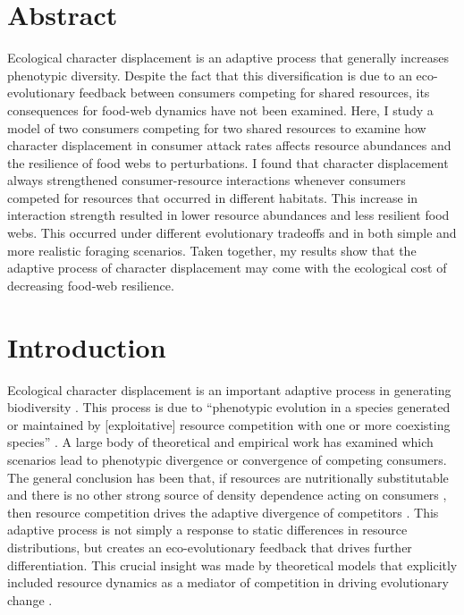 \documentclass[11pt,]{article}
\begin{document}
\newpage

\section{Abstract}\label{abstract}

Ecological character displacement is an adaptive process that generally
increases phenotypic diversity. Despite the fact that this
diversification is due to an eco-evolutionary feedback between consumers
competing for shared resources, its consequences for food-web dynamics
have not been examined. Here, I study a model of two consumers competing
for two shared resources to examine how character displacement in
consumer attack rates affects resource abundances and the resilience of
food webs to perturbations. I found that character displacement always
strengthened consumer-resource interactions whenever consumers competed
for resources that occurred in different habitats. This increase in
interaction strength resulted in lower resource abundances and less
resilient food webs. This occurred under different evolutionary
tradeoffs and in both simple and more realistic foraging scenarios.
Taken together, my results show that the adaptive process of character
displacement may come with the ecological cost of decreasing food-web
resilience.

\newpage

\section{Introduction}\label{introduction}

Ecological character displacement is an important adaptive process in
generating biodiversity \citep{Schluter2000, Pfennig2010}. This process
is due to ``phenotypic evolution in a species generated or maintained by
{[}exploitative{]} resource competition with one or more coexisting
species'' \citep{Schluter2000}. A large body of theoretical
\citep[e.g.][]{Lawlor1976, Abrams1986, Doebeli1996, Taper1985, McPeek2019}
and empirical \citep[reviewed
in:][]{Schluter2000, Dayan2005, Stuart2013} work has examined which
scenarios lead to phenotypic divergence or convergence of competing
consumers. The general conclusion has been that, if resources are
nutritionally substitutable \citep{Abrams1987, Fox2008} and there is no
other strong source of density dependence acting on consumers
\citep{Abrams1986}, then resource competition drives the adaptive
divergence of competitors \citep{Lawlor1976, Taper1985}. This adaptive
process is not simply a response to static differences in resource
distributions, but creates an eco-evolutionary feedback that drives
further differentiation. This crucial insight was made by theoretical
models that explicitly included resource dynamics as a mediator of
competition in driving evolutionary change
\citep{Lawlor1976, Abrams1986, Taper1985}.
\end{document}
